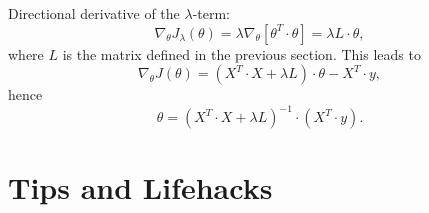 \documentclass[a4paper,11pt]{article}
\begin{document}
Directional derivative of the $\lambda$-term:
\begin{equation}
\nabla_\theta J_\lambda \left(\theta \right) = \lambda \nabla_\theta \left[ \theta^T \cdot \theta \right] = \lambda L \cdot \theta ,
\end{equation}
where $L$ is the matrix defined in the previous section. This leads to
\begin{equation}
\nabla_\theta J \left( \theta \right) = \left( X^T \cdot X + \lambda L \right) \cdot \theta - X^T \cdot y ,
\end{equation}
hence
\begin{equation}
\theta = \left( X^T \cdot X + \lambda L \right) ^{-1} \cdot \left(X^T \cdot y \right) .
\end{equation}

\section{Tips and Lifehacks}
\end{document}
